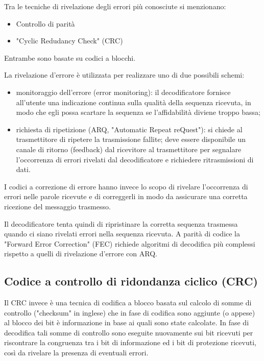 \documentclass[LaM,binding=0.6cm]{../sapthesis}
\begin{document}
Tra le tecniche di rivelazione degli errori più conosciute si menzionano:
\begin{itemize}
    \item Controllo di parità
    \item "Cyclic Redudancy Check" (CRC)
\end{itemize}

Entrambe sono basate su codici a blocchi.

La rivelazione d'errore è utilizzata per realizzare uno di due possibili schemi:
\begin{itemize}
    \item monitoraggio dell'errore (error monitoring): il decodificatore fornisce all'utente una indicazione continua sulla qualità della sequenza ricevuta, in modo che egli possa scartare la sequenza se l'affidabilità diviene troppo bassa;
    
    \item richiesta di ripetizione (ARQ, "Automatic Repeat reQuest"): si chiede al trasmettitore di ripetere la trasmissione fallite; deve essere disponibile un canale di ritorno (feedback) dal ricevitore al trasmettitore per segnalare l'occorrenza di errori rivelati dal decodificatore e richiedere ritrasmissioni di dati.
\end{itemize}


\newline
I codici a correzione di errore hanno invece lo scopo di rivelare l'occorrenza di errori nelle parole ricevute e di correggerli in modo da assicurare una corretta ricezione del messaggio trasmesso.

Il decodificatore tenta quindi di ripristinare la corretta sequenza trasmessa quando ci siano rivelati errori nella sequenza ricevuta. A parità di codice la "Forward Error Correction" (FEC) richiede algoritmi di decodifica più complessi rispetto a quelli di rivelazione d'errore con ARQ.


\subsection{Codice a controllo di ridondanza ciclico (CRC)}

Il CRC invece è una tecnica di codifica a blocco basata sul calcolo di somme di controllo ("checksum" in inglese) che in fase di codifica sono aggiunte (o appese) al blocco dei bit è informazione in base ai quali sono state calcolate. In fase di decodifica tali somme di controllo sono eseguite nuovamente sui bit ricevuti per riscontrare la congruenza tra i bit di informazione ed i bit di protezione ricevuti, così da rivelare la presenza di eventuali errori.
\end{document}
